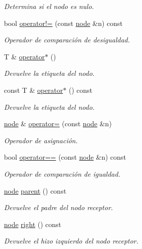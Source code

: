 \begin{DoxyCompactItemize}
\begin{DoxyCompactList}\small\item\em Determina si el nodo es nulo. \end{DoxyCompactList}\item 
bool \hyperlink{classbintree_1_1node_a974d5b4ec4b8bb38b766baef5acb81c6}{operator!=} (const \hyperlink{classbintree_1_1node}{node} \&n) const 
\begin{DoxyCompactList}\small\item\em Operador de comparación de desigualdad. \end{DoxyCompactList}\item 
T \& \hyperlink{classbintree_1_1node_ae3b25e1d16c449a3c0e211cd0ebe5739}{operator$\ast$} ()
\begin{DoxyCompactList}\small\item\em Devuelve la etiqueta del nodo. \end{DoxyCompactList}\item 
const T \& \hyperlink{classbintree_1_1node_af9119b26b416b2a8a8c8b1ff7ec1a3e7}{operator$\ast$} () const 
\begin{DoxyCompactList}\small\item\em Devuelve la etiqueta del nodo. \end{DoxyCompactList}\item 
\hyperlink{classbintree_1_1node}{node} \& \hyperlink{classbintree_1_1node_a184f20617c0324caa3f66e4dce1338e5}{operator=} (const \hyperlink{classbintree_1_1node}{node} \&n)
\begin{DoxyCompactList}\small\item\em Operador de asignación. \end{DoxyCompactList}\item 
bool \hyperlink{classbintree_1_1node_ab1dd1b2d59b615f92850e5f8675fb141}{operator==} (const \hyperlink{classbintree_1_1node}{node} \&n) const 
\begin{DoxyCompactList}\small\item\em Operador de comparación de igualdad. \end{DoxyCompactList}\item 
\hyperlink{classbintree_1_1node}{node} \hyperlink{classbintree_1_1node_a09ca860544efb439a685bbeb5d3107a9}{parent} () const 
\begin{DoxyCompactList}\small\item\em Devuelve el padre del nodo receptor. \end{DoxyCompactList}\item 
\hyperlink{classbintree_1_1node}{node} \hyperlink{classbintree_1_1node_a547b66653137db889451d4dbaffde8f9}{right} () const 
\begin{DoxyCompactList}\small\item\em Devuelve el hizo izquierdo del nodo receptor. \end{DoxyCompactList}\end{DoxyCompactItemize}
